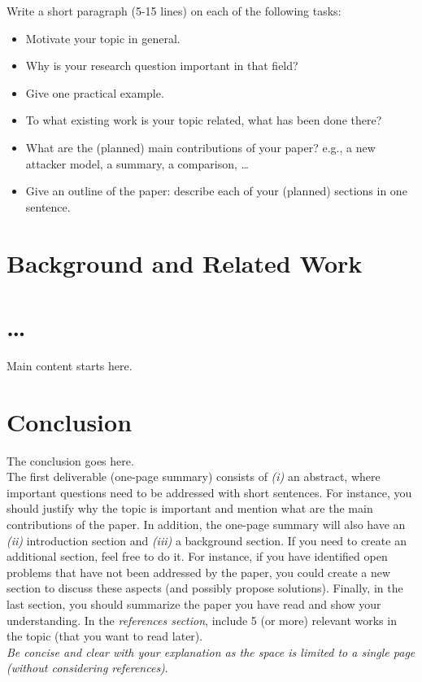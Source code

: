 \documentclass[sigconf]{acmart}
\begin{document}
Write a short paragraph (5-15 lines) on each of the following tasks:
\begin{itemize}
\item Motivate your topic in general.
\item Why is your research question important in that field?
\item Give one practical example.
\item To what existing work is your topic related, what has been done there?
\item What are the (planned) main contributions of your paper? e.g., a
new attacker model, a summary, a comparison, \dots
\item Give an outline of the paper: describe each of your (planned)
sections in one sentence.
\end{itemize}


\section{Background and Related Work}

\section{\dots}

Main content starts here. \nocite{*}


\section{Conclusion}
The conclusion goes here.\\

 The first deliverable (one-page summary) consists of \emph{(i)} an abstract, where important questions need to be addressed with short sentences. For instance, you should justify why the topic is important and mention what are the main contributions of the paper. In addition, the one-page summary will also have an \emph{(ii)} introduction section and \emph{(iii)} a background section. If you need to create an additional section, feel free to do it. For instance, if you have identified open problems that have not been addressed by the paper, you could create a new section to discuss these aspects (and possibly propose solutions). Finally, in the last section, you should summarize the paper you have read and show your understanding. In the \emph{references section}, include 5 (or more) relevant works in the topic (that you want to read later). \\

\emph{Be concise and clear with your explanation as the space is limited to a single page (without considering references)}.


 
\end{document}
